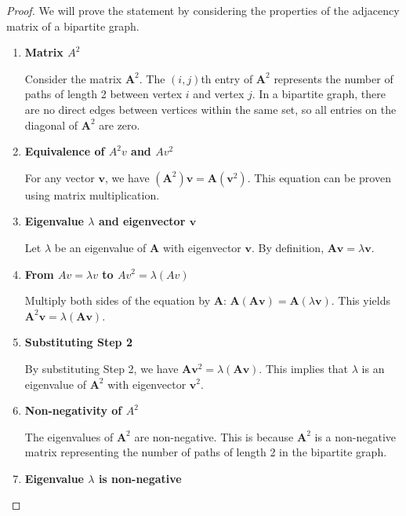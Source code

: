\documentclass{article}
\newcommand{\vect}[1]{\mathbf{#1}}
\newcommand{\mat}[1]{\mathbf{#1}}
\begin{document}
\begin{proof}
We will prove the statement by considering the properties of the adjacency matrix of a bipartite graph.

\begin{enumerate}[label=\textbf{Step \arabic*:}, wide=0pt, leftmargin=!, itemindent=2em]
    \item \textbf{Matrix $A^2$}
    
    Consider the matrix $\mat{A}^2$. The $(i, j)$th entry of $\mat{A}^2$ represents the number of paths of length 2 between vertex $i$ and vertex $j$. In a bipartite graph, there are no direct edges between vertices within the same set, so all entries on the diagonal of $\mat{A}^2$ are zero.
    
    \item \textbf{Equivalence of $A^2v$ and $Av^2$}
    
    For any vector $\vect{v}$, we have $(\mat{A}^2)\vect{v} = \mat{A}(\vect{v}^2)$. This equation can be proven using matrix multiplication.
    
    \item \textbf{Eigenvalue $\lambda$ and eigenvector $\vect{v}$}
    
    Let $\lambda$ be an eigenvalue of $\mat{A}$ with eigenvector $\vect{v}$. By definition, $\mat{A}\vect{v} = \lambda\vect{v}$.
    
    \item \textbf{From $Av = \lambda v$ to $Av^2 = \lambda(Av)$}
    
    Multiply both sides of the equation by $\mat{A}$: $\mat{A}(\mat{A}\vect{v}) = \mat{A}(\lambda\vect{v})$. This yields $\mat{A}^2\vect{v} = \lambda(\mat{A}\vect{v})$.
    
    \item \textbf{Substituting Step 2}
    
    By substituting Step 2, we have $\mat{A}\vect{v}^2 = \lambda(\mat{A}\vect{v})$. This implies that $\lambda$ is an eigenvalue of $\mat{A}^2$ with eigenvector $\vect{v}^2$.
    
    \item \textbf{Non-negativity of $A^2$}
    
    The eigenvalues of $\mat{A}^2$ are non-negative. This is because $\mat{A}^2$ is a non-negative matrix representing the number of paths of length 2 in the bipartite graph.
    
    \item \textbf{Eigenvalue $\lambda$ is non-negative}
    

\end{enumerate}
\end{proof}
\end{document}
